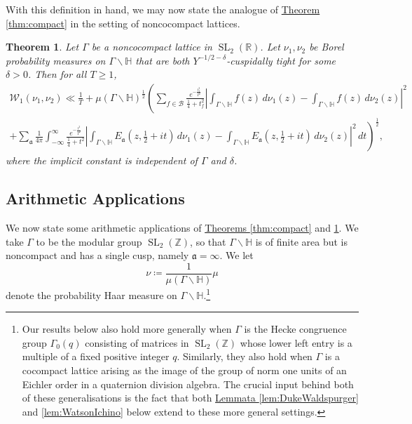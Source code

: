 \documentclass[11pt,a4paper]{amsart}
\newcommand{\af}{\mathfrak{a}}
\newcommand{\BB}{\mathcal{B}}
\newcommand{\Hb}{\mathbb{H}}
\newcommand{\R}{\mathbb{R}}
\newcommand{\Wscr}{\mathscr{W}}
\newcommand{\Z}{\mathbb{Z}}
\DeclareMathOperator{\SL}{SL}
\numberwithin{equation}{section}
\newtheorem{theorem}[equation]{Theorem}
\theoremstyle{remark}
\theoremstyle{definition}
\begin{document}
With this definition in hand, we may now state the analogue of \hyperref[thm:compact]{Theorem \ref*{thm:compact}} in the setting of noncocompact lattices.

\begin{theorem}
\label{thm:noncompact}
Let $\Gamma$ be a noncocompact lattice in $\SL_2(\R)$. Let $\nu_1,\nu_2$ be Borel probability measures on $\Gamma \backslash \Hb$ that are both $Y^{-1/2 - \delta}$-cuspidally tight for some $\delta > 0$. Then for all $T \geq 1$,
\begin{multline}
\label{eqn:noncompact}
\Wscr_1(\nu_1,\nu_2) \ll \frac{1}{T} + \mu(\Gamma \backslash \Hb)^{\frac{1}{2}} \left(\sum_{f \in \BB} \frac{e^{-\frac{t_f^2}{T^2}}}{\frac{1}{4} + t_f^2} \left|\int_{\Gamma \backslash \Hb} f(z) \, d\nu_1(z) - \int_{\Gamma \backslash \Hb} f(z) \, d\nu_2(z)\right|^2 \right.	\\
\left. + \sum_{\af} \frac{1}{4\pi} \int_{-\infty}^{\infty} \frac{e^{-\frac{t^2}{T^2}}}{\frac{1}{4} + t^2} \left|\int_{\Gamma \backslash \Hb} E_{\af}\left(z,\frac{1}{2} + it\right) \, d\nu_1(z) - \int_{\Gamma \backslash \Hb} E_{\af}\left(z,\frac{1}{2} + it\right) \, d\nu_2(z)\right|^2 \, dt\right)^{\frac{1}{2}},
\end{multline}
where the implicit constant is independent of $\Gamma$ and $\delta$.
\end{theorem}


\subsection{Arithmetic Applications}
\label{sec:arithmetic}

We now state some arithmetic applications of \hyperref[thm:compact]{Theorems \ref*{thm:compact}} and \ref{thm:noncompact}. We take $\Gamma$ to be the modular group $\SL_2(\Z)$, so that $\Gamma \backslash \Hb$ is of finite area but is noncompact and has a single cusp, namely $\af = \infty$. We let
\[\nu \coloneqq \frac{1}{\mu(\Gamma \backslash \Hb)} \mu\]
denote the probability Haar measure on $\Gamma \backslash \Hb$.\footnote{Our results below also hold more generally when $\Gamma$ is the Hecke congruence group $\Gamma_0(q)$ consisting of matrices in $\SL_2(\Z)$ whose lower left entry is a multiple of a fixed positive integer $q$. Similarly, they also hold when $\Gamma$ is a cocompact lattice arising as the image of the group of norm one units of an Eichler order in a quaternion division algebra. The crucial input behind both of these generalisations is the fact that both \hyperref[lem:DukeWaldspurger]{Lemmata \ref*{lem:DukeWaldspurger}} and \ref{lem:WatsonIchino} below extend to these more general settings.}
\end{document}

